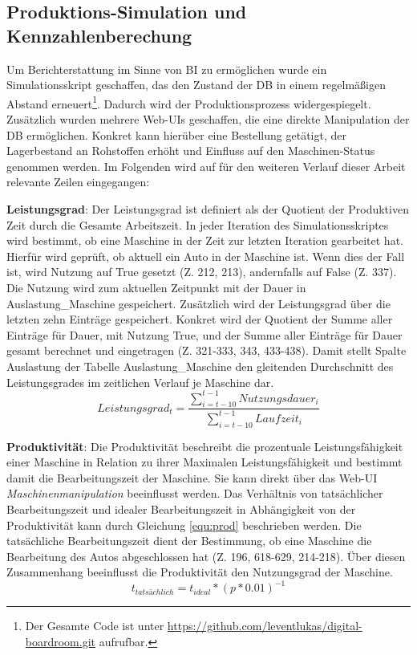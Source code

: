 \subsection{Produktions-Simulation und Kennzahlenberechung} \label{abs:Kenn}
 Um Berichterstattung im Sinne von \ac{BI} zu ermöglichen wurde ein Simulationsskript geschaffen, das den Zustand der \ac{DB} in einem regelmäßigen Abstand erneuert\footnote{Der Gesamte Code ist unter \url{https://github.com/leventlukas/digital-boardroom.git} aufrufbar.}. Dadurch wird der Produktionsprozess widergespiegelt. Zusätzlich wurden mehrere Web-UIs geschaffen, die eine direkte Manipulation der \ac{DB} ermöglichen. Konkret kann hierüber eine Bestellung getätigt, der Lagerbestand an Rohstoffen erhöht und Einfluss auf den Maschinen-Status genommen werden. Im Folgenden wird auf für den weiteren Verlauf dieser Arbeit relevante Zeilen eingegangen:

\textbf{Leistungsgrad}: Der Leistungsgrad ist definiert als der Quotient der Produktiven Zeit durch die Gesamte Arbeitszeit. In jeder Iteration des Simulationsskriptes wird bestimmt, ob eine Maschine in der Zeit zur letzten Iteration gearbeitet hat. Hierfür wird geprüft, ob aktuell ein Auto in der Maschine ist. Wenn dies der Fall ist, wird Nutzung auf True gesetzt (Z. 212, 213), andernfalls
 auf False (Z. 337). Die Nutzung wird zum aktuellen Zeitpunkt mit der Dauer in Auslastung\_Maschine gespeichert. Zusätzlich wird der Leistungsgrad über die letzten zehn Einträge gespeichert. Konkret wird der Quotient der Summe aller Einträge für Dauer, mit Nutzung True, und der Summe aller Einträge für Dauer gesamt berechnet und eingetragen (Z. 321-333, 343, 433-438). Damit stellt Spalte Auslastung der Tabelle Auslastung\_Maschine den gleitenden Durchschnitt des Leistungsgrades im zeitlichen Verlauf je Maschine dar.
 \begin{equation}\label{equ:nutz}
    Leistungsgrad_t = \frac{\sum_{i=t-10}^{t-1} Nutzungsdauer_i}{\sum_{i=t-10}^{t-1} Laufzeit_i}
\end{equation}

\textbf{Produktivität}: Die Produktivität beschreibt die prozentuale Leistungsfähigkeit einer Maschine in Relation zu ihrer Maximalen Leistungsfähigkeit und bestimmt damit die Bearbeitungszeit der Maschine. Sie kann direkt über das Web-UI \textit{Maschinenmanipulation} beeinflusst werden. Das Verhältnis von tatsächlicher Bearbeitungszeit und idealer Bearbeitungszeit in Abhängigkeit von der Produktivität kann durch Gleichung \ref{equ:prod} beschrieben werden. Die tatsächliche Bearbeitungszeit dient der Bestimmung, ob eine Maschine die Bearbeitung des Autos abgeschlossen hat (Z. 196, 618-629, 214-218). Über diesen Zusammenhang beeinflusst die Produktivität den Nutzungsgrad der Maschine.
\begin{equation}\label{equ:prod}
    t_{tatsächlich} = t_{ideal}*(p*0.01)^{-1}
\end{equation}

